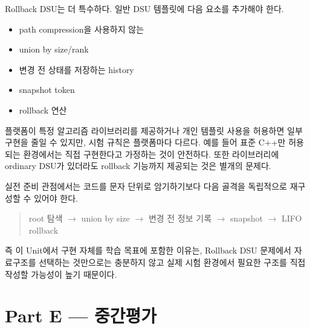 Rollback DSU는 더 특수하다. 일반 DSU 템플릿에 다음 요소를 추가해야 한다.
\begin{itemize}
\item path compression을 사용하지 않는 
\item union by size/rank
\item 변경 전 상태를 저장하는 history
\item snapshot token
\item rollback 연산
\end{itemize}

플랫폼이 특정 알고리즘 라이브러리를 제공하거나 개인 템플릿 사용을 허용하면 일부 구현을 줄일 수 있지만, 시험 규칙은 플랫폼마다 다르다. 예를 들어 표준 C++만 허용되는 환경에서는 직접 구현한다고 가정하는 것이 안전하다. 또한 라이브러리에 ordinary DSU가 있더라도 rollback 기능까지 제공되는 것은 별개의 문제다.

실전 준비 관점에서는 코드를 문자 단위로 암기하기보다 다음 골격을 독립적으로 재구성할 수 있어야 한다.
\begin{quote}
root 탐색 $\rightarrow$ union by size $\rightarrow$ 변경 전 정보 기록 $\rightarrow$ snapshot $\rightarrow$ LIFO rollback
\end{quote}

즉 이 Unit에서 구현 자체를 학습 목표에 포함한 이유는, Rollback DSU 문제에서 자료구조를 선택하는 것만으로는 충분하지 않고 실제 시험 환경에서 필요한 구조를 직접 작성할 가능성이 높기 때문이다.


\section{Part E --- 중간평가}


